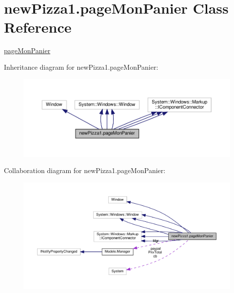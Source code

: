 \hypertarget{classnewPizza1_1_1pageMonPanier}{}\section{new\+Pizza1.\+page\+Mon\+Panier Class Reference}
\label{classnewPizza1_1_1pageMonPanier}


\hyperlink{classnewPizza1_1_1pageMonPanier}{page\+Mon\+Panier}  




Inheritance diagram for new\+Pizza1.\+page\+Mon\+Panier\+:
\nopagebreak
\begin{figure}[H]
\begin{center}
\leavevmode
\includegraphics[width=350pt]{classnewPizza1_1_1pageMonPanier__inherit__graph}
\end{center}
\end{figure}


Collaboration diagram for new\+Pizza1.\+page\+Mon\+Panier\+:
\nopagebreak
\begin{figure}[H]
\begin{center}
\leavevmode
\includegraphics[width=350pt]{classnewPizza1_1_1pageMonPanier__coll__graph}
\end{center}
\end{figure}

